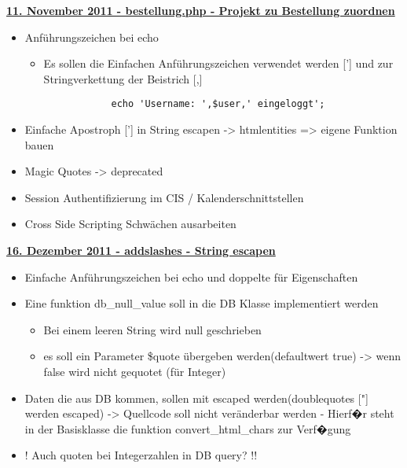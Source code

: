 \underline{{\bf 11. November 2011 - bestellung.php - Projekt zu Bestellung zuordnen}}
\begin{itemize}
	\item Anf\"uhrungszeichen bei echo
		\begin{itemize}
		\item Es sollen die Einfachen Anf\"uhrungszeichen verwendet werden ['] und zur Stringverkettung der Beistrich [,]
			\begin{verbatim}
			echo 'Username: ',$user,' eingeloggt'; 
			\end{verbatim}
		\end{itemize}
	\item Einfache Apostroph ['] in String escapen -> htmlentities => eigene Funktion bauen
	\item Magic Quotes -> deprecated
	\item Session Authentifizierung im CIS / Kalenderschnittstellen
	\item Cross Side Scripting Schw\"achen ausarbeiten \newline
\end{itemize}

\underline{{\bf 16. Dezember 2011 - addslashes - String escapen}}
\begin{itemize}
	\item Einfache Anf\"uhrungszeichen bei echo und doppelte f\"ur Eigenschaften 
	\item Eine funktion db\_null\_value soll in die DB Klasse implementiert werden 
	\begin{itemize}
		\item Bei einem leeren String wird null geschrieben
		\item es soll ein Parameter \$quote \"ubergeben werden(defaultwert true) -> wenn false wird nicht gequotet (f\"ur Integer) 
	\end{itemize}
	\item Daten die aus DB kommen, sollen mit escaped werden(doublequotes ["] werden escaped) -> Quellcode soll nicht ver\"anderbar werden - Hierf�r steht in der Basisklasse die funktion convert\_html\_chars zur Verf�gung
	\item ! Auch quoten bei Integerzahlen in DB query? !!\newline
\end{itemize}

